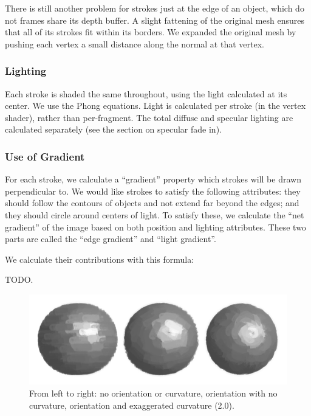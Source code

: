 \documentclass[conference]{acmsiggraph}
\begin{document}
There is still another problem for strokes just at the edge of an object, which
do not frames share its depth buffer. A slight fattening of the original mesh
ensures that all of its strokes fit within its borders. We expanded the
original mesh by pushing each vertex a small distance along the normal at that
vertex.

\subsubsection{Lighting}

Each stroke is shaded the same throughout, using the light calculated at its
center. We use the Phong equations. Light is calculated per stroke (in the
vertex shader), rather than per-fragment. The total diffuse and specular
lighting are calculated separately (see the section on specular fade in).


\subsubsection{Use of Gradient}

For each stroke, we calculate a ``gradient'' property which strokes will be
drawn perpendicular to. We would like strokes to satisfy the following
attributes: they should follow the contours of objects and not extend far
beyond the edges; and they should circle around centers of light. To satisfy
these, we calculate the ``net gradient'' of the image based on both position
and lighting attributes. These two parts are called the ``edge gradient'' and
``light gradient''.

We calculate their contributions with this formula:

TODO.


\begin{figure}[ht]
  \centering
  \includegraphics[width=6.0in]{images/sphere_rotation_curve}
  \caption{From left to right: no orientation or curvature, orientation with
           no curvature, orientation and exaggerated curvature (2.0).}
\end{figure}
\end{document}
